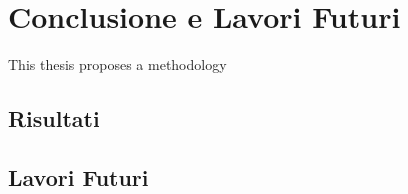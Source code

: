 
\chapter{Conclusione e Lavori Futuri}\label{chap9:Concl}
This thesis proposes a methodology 
\section{Risultati}

\section{Lavori Futuri}